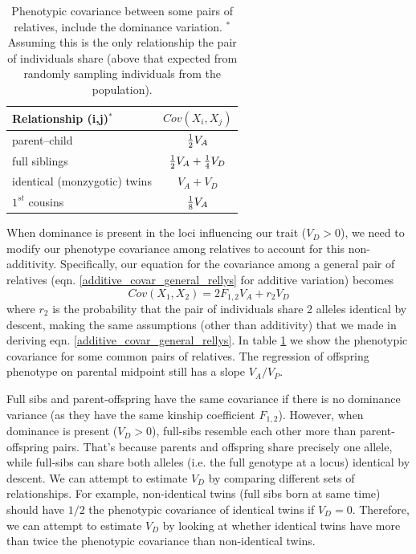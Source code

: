 \begin{table}
\begin{center}
\begin{tabular}{| l | c|}
\hline
Relationship (i,j)$^{*}$ &  $Cov(X_i,X_j)$  \\
\hline
parent--child & $\nicefrac{1}{2} V_A$\\
full siblings &$\nicefrac{1}{2} V_A +\nicefrac{1}{4} V_D$\\
identical (monzygotic) twins & $V_A+V_D$ \\
$1^{st}$ cousins & $\nicefrac{1}{8} V_A$\\
\hline
\end{tabular}
\end{center}
\caption{Phenotypic covariance between some pairs of relatives,
  include the dominance variation. $^{*}$Assuming this is the only relationship
the pair of individuals share (above that expected from randomly
sampling individuals from the population). } %
\label{table:domcovar}
\end{table}

When dominance is present in the loci influencing our trait ($V_D>0$), we need to modify our
phenotype covariance among relatives to account for this
non-additivity. Specifically, our equation for the covariance among a
general pair of relatives
(eqn. \ref{additive_covar_general_rellys} for additive variation) becomes
\begin{equation}
 Cov(X_1,X_2) = 2 F_{1,2} V_A + r_2 V_D
\end{equation}
where $r_2$ is the probability that the pair of individuals share 2
alleles identical by descent, making the same assumptions (other than additivity) that we made in deriving
eqn. \ref{additive_covar_general_rellys}.  In table
\ref{table:domcovar} we show the phenotypic covariance for some common
pairs of relatives. The regression of offspring phenotype on parental
midpoint still has a slope $V_A/V_P$. 

Full sibs and parent-offspring have the same
covariance if there is no dominance variance (as they have the same
kinship coefficient $F_{1,2}$). However, when dominance
is present ($V_D>0$), full-sibs resemble each other more than
parent-offspring pairs. That's because parents and offspring share
precisely one allele, while full-sibs can share both alleles (i.e. the
full genotype at a locus) identical by descent. We can attempt to
estimate $V_D$ by comparing different sets of relationships. For
example, non-identical twins (full sibs born at same time) 
should have $1/2$ the phenotypic covariance of identical twins if
$V_D=0$. Therefore, we can attempt to estimate $V_D$ by looking at
whether identical twins have more than twice the phenotypic covariance
than non-identical twins. \\

